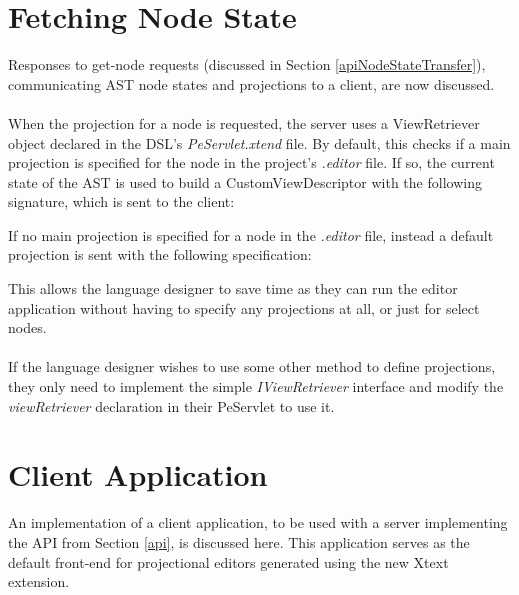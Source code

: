 \documentclass{article}
\begin{document}
{\section{Fetching Node State}\label{viewObject}
Responses to get-node requests (discussed in Section \ref{apiNodeStateTransfer}), communicating AST node states and projections to a client, are now discussed. 
%
\\
\\
When the projection for a node is requested, the server uses a ViewRetriever object declared in the DSL's \emph{PeServlet.xtend} file. By default, this checks if a main projection is specified for the node in the project's \emph{.editor} file. If so, the current state of the AST is used to build a CustomViewDescriptor with the following signature, which is sent to the client: 

\vspace*{0.1cm}
If no main projection is specified for a node in the \emph{.editor} file, instead a default projection is sent with the following specification: 

This allows the language designer to save time as they can run the editor application without having to specify any projections at all, or just for select nodes. 
\\
\\
If the language designer wishes to use some other method to define projections, they only need to implement the simple \emph{IViewRetriever} interface and modify the \emph{viewRetriever} declaration in their PeServlet to use it.


\section{Client Application}\label{clientApp}
An implementation of a client application, to be used with a  server implementing  the API from Section \ref{api}, is discussed here. This application serves as the default front-end for projectional editors generated using the new Xtext extension. 

}
\end{document}
